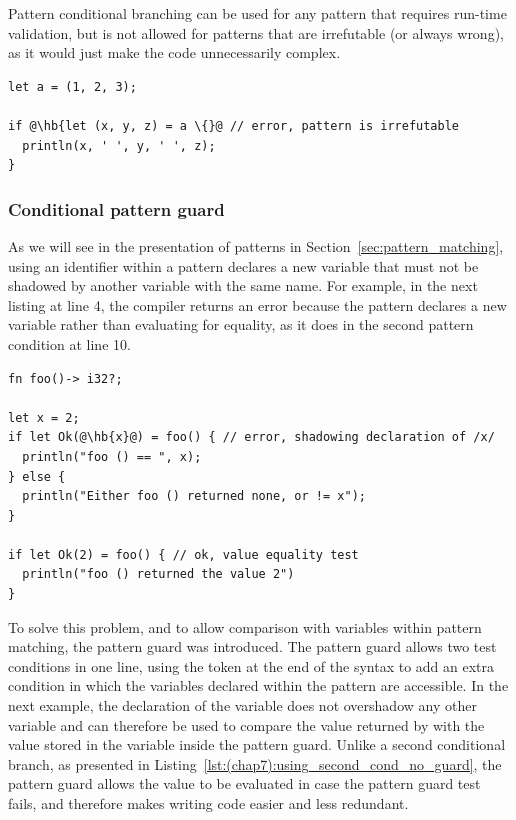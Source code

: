 Pattern conditional branching can be used for any pattern that requires run-time
validation, but is not allowed for patterns that are irrefutable (or always
wrong), as it would just make the code unnecessarily complex.

\begin{lstlisting}[style=coloredverbatimError, escapechar=@]
let a = (1, 2, 3);

if @\hb{let (x, y, z) = a \{}@ // error, pattern is irrefutable
  println(x, ' ', y, ' ', z);
}
\end{lstlisting}

\subsubsection{Conditional pattern guard}

As we will see in the presentation of patterns in
Section~\ref{sec:pattern_matching}, using an identifier within a pattern
declares a new variable that must not be shadowed by another variable with the
same name. For example, in the next listing at line 4, the compiler returns an
error because the pattern declares a new variable  rather than
evaluating for equality, as it does in the second pattern condition at line 10.

\begin{lstlisting}[style=coloredverbatimError, escapechar=@]
fn foo()-> i32?;

let x = 2;
if let Ok(@\hb{x}@) = foo() { // error, shadowing declaration of /x/
  println("foo () == ", x);
} else {
  println("Either foo () returned none, or != x");
}

if let Ok(2) = foo() { // ok, value equality test
  println("foo () returned the value 2")
}
\end{lstlisting}

To solve this problem, and to allow comparison with variables within pattern
matching, the pattern guard was introduced. The pattern guard allows two test
conditions in one line, using the token \token{\&\&} at the end of the syntax
 to add an extra condition in which the
variables declared within the pattern are accessible. In the next example, the
declaration of the variable  does not overshadow any other variable and
can therefore be used to compare the value returned by  with the
value stored in the variable  inside the pattern guard. Unlike a second
conditional branch, as presented in
Listing~\ref{lst:(chap7):using_second_cond_no_guard}, the pattern guard allows the
 value to be evaluated in case the pattern guard test fails, and
therefore makes writing code easier and less redundant.

